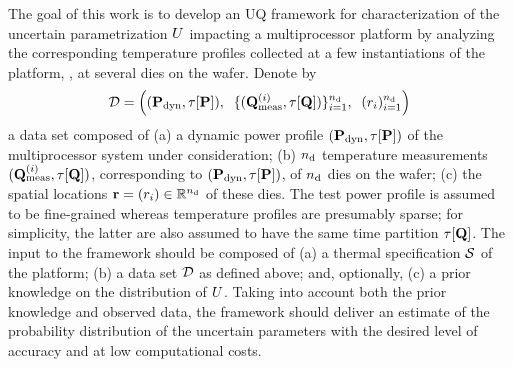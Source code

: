 The goal of this work is to develop an UQ framework for characterization of the uncertain parametrization $U$ impacting a multiprocessor platform by analyzing the corresponding temperature profiles collected at a few instantiations of the platform, \eg, at several dies on the wafer. Denote by
\[
  \mathcal{D} = \left( (\mathbf{P}_{\text{dyn}}, \tau[\mathbf{P}]), \; \; \{ (\mathbf{Q}^{(i)}_{\text{meas}}, \tau[\mathbf{Q}]) \}_{i = 1}^{n_\text{d}}, \; \; ( r_i )_{i = 1}^{n_\text{d}} \right)
\]
a data set composed of (a) a dynamic power profile $(\mathbf{P}_{\text{dyn}}, \tau[\mathbf{P}])$ of the multiprocessor system under consideration; (b) ${n_\text{d}}$ temperature measurements $(\mathbf{Q}^{(i)}_{\text{meas}}, \tau[\mathbf{Q}])$, corresponding to $(\mathbf{P}_{\text{dyn}}, \tau[\mathbf{P}])$, of ${n_\text{d}}$ dies on the wafer; (c) the spatial locations $\mathbf{r} = (r_i) \in \mathbb{R}^{n_\text{d}}$ of these dies. The test power profile is assumed to be fine-grained whereas temperature profiles are presumably sparse; for simplicity, the latter are also assumed to have the same time partition $\tau[\mathbf{Q}]$. The input to the framework should be composed of (a) a thermal specification $\mathcal{S}$ of the platform; (b) a data set $\mathcal{D}$ as defined above; and, optionally, (c) a prior knowledge on the distribution of $U$. Taking into account both the prior knowledge and observed data, the framework should deliver an estimate of the probability distribution of the uncertain parameters with the desired level of accuracy and at low computational costs.

